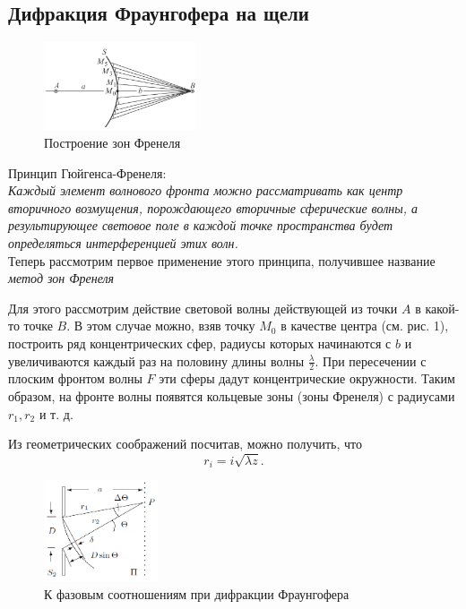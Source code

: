 \documentclass[a4paper, 12pt]{article}
\begin{document}
	\subsection{Дифракция Фраунгофера на щели}
	\begin{figure}
		\begin{center}
			\includegraphics[width = 0.4\textwidth]{431-2.png}
		\end{center}
		\caption{Построение зон Френеля}
	\end{figure}
	Принцип Гюйгенса-Френеля:\\
	\textit{Каждый элемент волнового фронта можно рассматривать как центр  вторичного возмущения, порождающего вторичные сферические волны, а результирующее световое поле  в каждой точке пространства будет определяться интерференцией этих волн.}\\
	Теперь рассмотрим первое применение этого принципа, получившее название \textit{метод зон Френеля}


	Для этого рассмотрим действие световой волны действующей из точки $A$ в какой-то точке $B$.
	В этом случае можно, взяв точку $M_0$ в качестве центра (см. рис. 1), построить ряд концентрических сфер, радиусы которых начинаются с $b$ и увеличиваются каждый раз на половину длины волны $\frac{\lambda}{2}$. При пересечении с плоским фронтом волны $F$ эти сферы дадут концентрические окружности. Таким образом, на фронте волны появятся кольцевые зоны (зоны Френеля) с радиусами $r_1, r_2$ и т. д.

	Из геометрических соображений посчитав, можно получить, что
	\begin{equation}
	r_i = i \sqrt{\lambda z}.
	\end{equation}
		\begin{figure}
		\begin{center}
			\includegraphics[width = 0.3\textwidth]{431-3.png}
		\end{center}
		\caption{К фазовым соотношениям при дифракции Фраунгофера}
	\end{figure}
\end{document}
